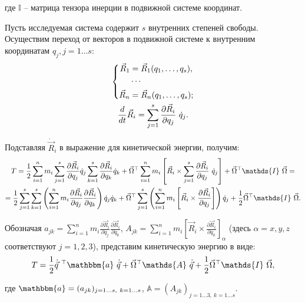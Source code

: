 \documentclass[12pt]{article}
\newcommand{\bbA}{\mathds{A}}
\newcommand{\bbI}{\mathds{I}}
\newcommand{\bba}{\mathbbm{a}}
\newcommand{\vlevo}{\hspace*{-0.63cm}}
\newcommand{\vverh}{\vspace*{-0.1cm}}
\begin{document}
\vlevo где $\bbI$ -- матрица тензора инерции в подвижной системе координат.

Пусть исследуемая система содержит $s$ внутренних степеней свободы. Осуществим переход от векторов в подвижной системе к внутренним координатам $q_j, j=1 \dots s$:
\vverh
\begin{gather}
\left\{
\begin{aligned}
\vec{R}_1 &= \vec{R}_1 (q_1, \dots, q_s), \\
&\cdots \\
\vec{R}_n &= \vec{R}_n (q_1, \dots, q_s);
\end{aligned}
\right. \notag \\
\frac{d}{dt} \vec{R}_i = \sum_{j=1}^{s} \frac{\partial \vec{R}_i}{\partial q_j} \ \dot{q}_j \notag .
\end{gather}

Подставляя $\dot{\vec{R}}_i$ в выражение для кинетической энергии, получим:
\vverh
\begin{gather}
T = \frac{1}{2} \sum_{i=1}^{n} m_i \sum_{j=1}^{s} \frac{\partial \vec{R}_i}{\partial q_j} \dot{q}_j \sum_{k=1}^{s} \frac{\partial \vec{R}_i}{\partial q_k} \dot{q}_k + \vec{\Omega}^\top \sum_{i=1}^{n} m_i \left[ \vec{R}_i \times \sum_{j=1}^{s} \frac{\partial \vec{R}_i}{\partial q_j} \ \dot{q}_j \right] + \vec{\Omega}^\top \bbI \ \vec{\Omega} = \notag \\
= \frac{1}{2} \sum_{j=1}^{s} \sum_{k=1}^{s} \left( \sum_{i=1}^{n} m_i \frac{\partial \vec{R}_i}{\partial q_j} \frac{\partial \vec{R}_i}{\partial q_k} \right) \dot{q}_j \dot{q}_k + \vec{\Omega}^\top \sum_{j=1}^{s} \left( \sum_{i=1}^{n} m_i \left[ \vec{R}_i \times \frac{\partial \vec{R}_i}{\partial q_j} \right] \right) \dot{q}_j + \frac{1}{2} \vec{\Omega}^\top \bbI \ \vec{\Omega} \notag .
\end{gather}

Обозначая $a_{jk} = \sum_{i=1}^{n} m_i \frac{\partial \vec{R}_i}{\partial q_j} \frac{\partial \vec{R}_i}{\partial q_k}$, $A_{jk} = \sum_{i=1}^{n} m_i \left[ \vec{R}_i \times \frac{\partial \vec{R}_i}{\partial q_k} \right]_{\alpha}$ (здесь $\alpha = x,y,z$ соответствуют $j=1,2,3$), представим кинетическую энергию в виде:
\vverh
\begin{gather}
T = \frac{1}{2} \dot{\vec{q}}^{\ \top} \bba \ \dot{\vec{q}} + \vec{\Omega}^\top \bbA \ \dot{\vec{q}} + \frac{1}{2} \vec{\Omega}^\top \bbI \ \vec{\Omega} \notag ,
\end{gather}

\vlevo где $\bba = (a_{jk})_{j=1 \dots s, \ k=1 \dots s}$, $\bbA = (A_{jk})_{j=1 \dots 3, \ k=1 \dots s}$.
\end{document}
